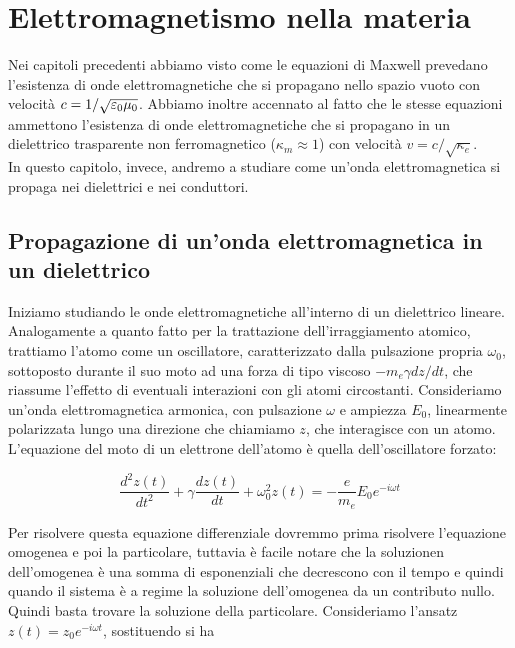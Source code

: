 \chapter{Elettromagnetismo nella materia}

Nei capitoli precedenti abbiamo visto come le equazioni di Maxwell prevedano l’esistenza di onde elettromagnetiche che si propagano nello spazio vuoto con velocità $c = 1/\sqrt{\varepsilon_0 \mu_0}$. 
Abbiamo inoltre accennato al fatto che le stesse equazioni ammettono l’esistenza di onde elettromagnetiche che si propagano in un dielettrico trasparente non ferromagnetico ($\kappa_m \approx 1$) con velocità $v = c/\sqrt{\kappa_e}$.\\
In questo capitolo, invece, andremo a studiare come un'onda elettromagnetica si propaga nei dielettrici e nei conduttori. 

\section{Propagazione di un'onda elettromagnetica in un dielettrico}

Iniziamo studiando le onde elettromagnetiche all'interno di un dielettrico lineare. \\

Analogamente a quanto fatto per la trattazione dell'irraggiamento atomico, trattiamo l'atomo come un oscillatore, caratterizzato dalla pulsazione propria $\omega_0$, sottoposto durante il suo moto ad una forza di tipo viscoso $-m_e \gamma dz/dt$, che riassume l'effetto di eventuali interazioni con gli atomi circostanti.
Consideriamo un'onda elettromagnetica armonica, con pulsazione $\omega$ e ampiezza $E_0$, linearmente polarizzata lungo una direzione che chiamiamo $z$, che interagisce con un atomo. 
L'equazione del moto di un elettrone dell'atomo è quella dell'oscillatore forzato:

\begin{tcolorbox}[colback=yellow!10!white, colframe=orange!70!black, boxrule=0.8pt]
\begin{equation}
    \frac{d^2 z(t)}{dt^2} + \gamma \frac{dz(t)}{dt} + \omega_0^2 z(t) = -\frac{e}{m_e} E_0 e^{-i\omega t}
\end{equation}
\end{tcolorbox}

Per risolvere questa equazione differenziale dovremmo prima risolvere l'equazione omogenea e poi la particolare, tuttavia è facile notare che la soluzionen dell'omogenea è una somma di esponenziali che decrescono con il tempo e quindi quando il sistema è a regime la soluzione dell'omogenea da un contributo nullo. 
Quindi basta trovare la soluzione della particolare. Consideriamo l'ansatz $z(t) = z_0 e^{-i\omega t}$, sostituendo si ha

